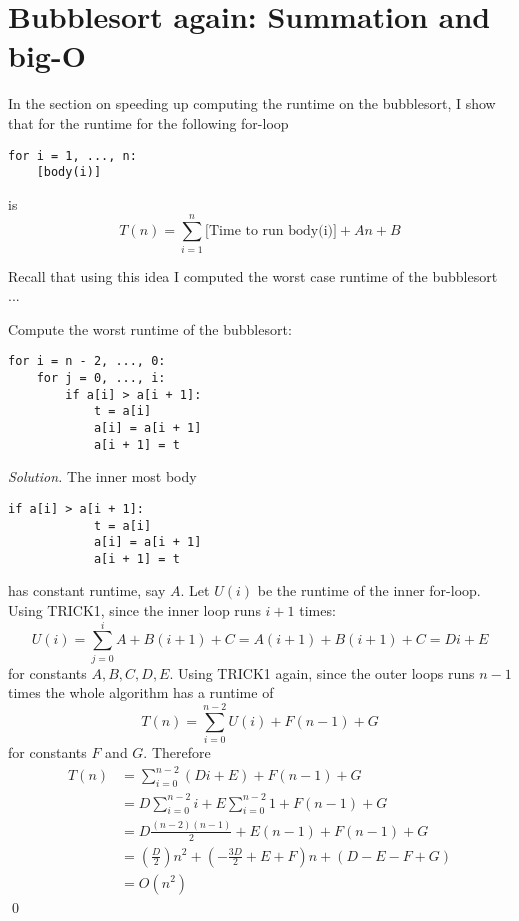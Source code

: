 \section{Bubblesort again: Summation and big-O}

In the section on speeding up computing the runtime on the bubblesort, I show
that for the runtime for the following for-loop
\begin{Verbatim}[frame=single, fontsize=\footnotesize]
for i = 1, ..., n:
    [body(i)]
\end{Verbatim}
is
\[
T(n) = \sum_{i=1}^n \text{[Time to run body(i)]} + An + B
\]

Recall that using this idea I computed the worst case runtime of the bubblesort ...
\newpage

\begin{eg}
Compute the worst runtime of the bubblesort:
\begin{Verbatim}[frame=single, fontsize=\footnotesize]
for i = n - 2, ..., 0:
    for j = 0, ..., i:
        if a[i] > a[i + 1]:
            t = a[i]
            a[i] = a[i + 1]
            a[i + 1] = t
\end{Verbatim}
\end{eg}

\textit{ Solution.}
The inner most body 
\begin{Verbatim}[frame=single, fontsize=\footnotesize]
        if a[i] > a[i + 1]:
            t = a[i]
            a[i] = a[i + 1]
            a[i + 1] = t
\end{Verbatim}
has constant runtime, say $A$.
Let $U(i)$ be the runtime of the inner for-loop.
Using TRICK1, since the inner loop runs $i + 1$ times:
\[
U(i) = \sum_{j=0}^i A + B(i+1) + C = A(i+1) + B(i+1) + C = Di + E
\]
for constants $A, B, C, D, E$.
Using TRICK1 again, since the outer loops runs $n - 1$ times
the whole algorithm has a runtime of
\[
T(n) = \sum_{i=0}^{n-2} U(i) + F(n-1) + G
\]
for constants $F$ and $G$.
Therefore
\begin{align*}
T(n) 
&= \sum_{i=0}^{n-2} (Di + E) + F(n-1) + G \\
&= D \sum_{i=0}^{n-2} i + E \sum_{i=0}^{n-2} 1 + F(n-1) + G \\
&= D \frac{(n-2)(n-1)}{2}  + E(n-1) + F(n-1) + G \\
&= \left(\frac{D}{2}\right) n^2 
   + \left( 
       -\frac{3D}{2} + E + F \right)n + \left(D - E - F + G
     \right) \\
&=O (n^2)
\end{align*}
\qed

